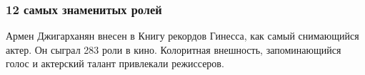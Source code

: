  
 
 

\subsubsection{12 самых знаменитых ролей}
\label{sec:14_11_2020.news.ua.strana.1.deaths.armen_dzhiharnajan.12_roles}

Армен Джигарханян внесен в Книгу рекордов Гинесса, как самый снимающийся
актер. Он сыграл 283 роли в кино. Колоритная внешность, запоминающийся
голос и актерский талант привлекали режиссеров.

